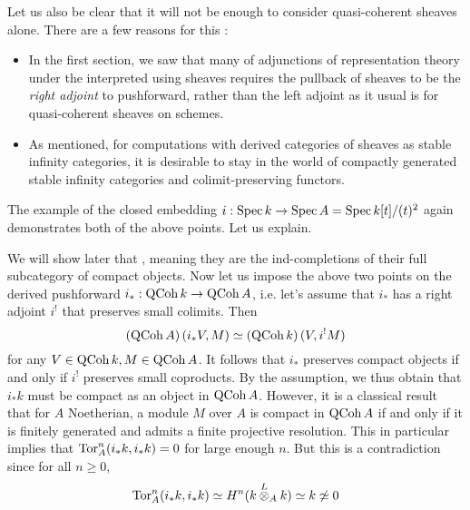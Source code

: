 \documentclass[./main.tex]{subfiles}
\begin{document}
Let us also be clear that it will not be enough to consider
quasi-coherent sheaves alone.
There are a few reasons for this : 
\begin{itemize}
  \item In the first section,
  we saw that many of adjunctions of representation theory
  under the interpreted using sheaves requires the pullback of sheaves to be
  the \emph{right adjoint} to pushforward,
  rather than the left adjoint as it usual is for quasi-coherent sheaves
  on schemes.

  \item As mentioned, 
  for computations with derived categories of sheaves
  as stable infinity categories, 
  it is desirable to stay in the world of
  compactly generated stable infinity categories and colimit-preserving functors.

\end{itemize}
The example of the closed embedding 
$i : \mathrm{Spec}\,k \to \mathrm{Spec}\,A = \mathrm{Spec}\,k[t]/(t)^2$
again demonstrates both of the above points.
Let us explain.

We will show later that
,
meaning 
{they are the ind-completions of their full subcategory of 
compact objects}.
Now let us impose the above two points on
the derived pushforward $i_* : \mathrm{QCoh}\,k \to \mathrm{QCoh}\,A$,
i.e. let's assume that $i_*$ has a right adjoint $i^!$ that 
preserves small colimits.
Then \[
  \left(\mathrm{QCoh}\,A\right)(i_* V , M) \simeq \left(\mathrm{QCoh}\,k\right)(V , i^! M)
\]
for any $V \in \mathrm{QCoh}\,k , M \in \mathrm{QCoh}\,A$.
It follows that $i_*$ preserves compact objects
if and only if $i^!$ preserves small coproducts.
By the assumption,
we thus obtain that $i_* k$ must be compact as an object in $\mathrm{QCoh}\,A$.
However, it is a classical result that
for $A$ Noetherian, a module $M$ over $A$ is compact in $\mathrm{QCoh}\,A$
if and only if it is finitely generated and admits a
finite projective resolution.
This in particular implies that $\mathrm{Tor}_A^n(i_*k , i_*k) = 0$ for large enough
$n$.
But this is a contradiction since for all $n \geq 0$, \[
  \mathrm{Tor}_A^n(i_*k , i_*k) \simeq H^n(k \overset{L}{\otimes}_A k) \simeq k \not\simeq 0
\]
\end{document}
